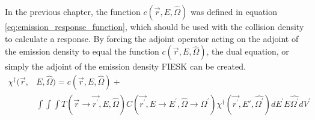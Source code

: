 In the previous chapter, the function $c(\vec{r},E,\hat{\Omega})$ was defined 
in equation \ref{eq:emission_response_function}, which should be used with 
the collision density to calculate a response. By forcing the adjoint 
operator acting on the adjoint of the emission density to equal the 
function $c(\vec{r},E,\hat{\Omega})$, the dual equation, or simply the adjoint
of the emission density FIESK can be created.
\begin{equation}
  \begin{split}
    \chi^{\dagger}(\vec{r},&E,\hat{\Omega}) = c(\vec{r},E,\hat{\Omega}) + \\
    &\int\int\int T(\vec{r} \to \vec{r^{'}},E,\hat{\Omega}) 
    C(\vec{r^{'}},E \to E^{'},\hat{\Omega} \to \hat{\Omega^{'}})
    \chi^{\dagger}(\vec{r^{'}},E',\hat{\Omega^{'}}) dE^{'}E\hat{\Omega^{'}}dV^{'}
  \end{split}
  \label{eq:adjoint_of_emission_density_integral_eqn}
\end{equation}

